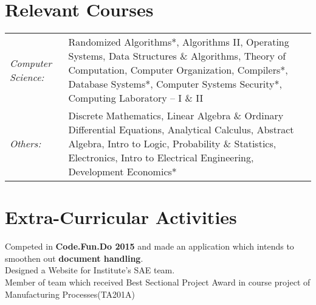 \documentclass[a4paper]{norm-resume}
\begin{document}
\vspace{2mm}    %


\section{Relevant Courses \hrulefill}

\vspace{2mm}

    \begin{tabular}{lp{15cm}}

	\normalsize\emph{Computer Science:} & \small{Randomized Algorithms*, Algorithms II, Operating Systems, Data Structures \& Algorithms, Theory of Computation, Computer Organization, Compilers*, Database Systems*, Computer Systems Security*, Computing Laboratory – I \& II} \\
	\normalsize\emph{Others:} & \small{Discrete Mathematics, Linear Algebra \& Ordinary Differential Equations, Analytical Calculus, Abstract Algebra, Intro to Logic, Probability \& Statistics, Electronics, Intro to Electrical Engineering}, Development Economics*
    \end{tabular}

\vspace{2mm}    %


\section{Extra-Curricular Activities \hrulefill}
\vspace{2mm}

    Competed in \textbf{Code.Fun.Do 2015} and made an application which intends to smoothen out \textbf{document handling}. \\
    Designed a Website for Institute’s SAE team. \\
    Member of team which received Best Sectional Project Award in course project of Manufacturing Processes(TA201A)
\end{document}

